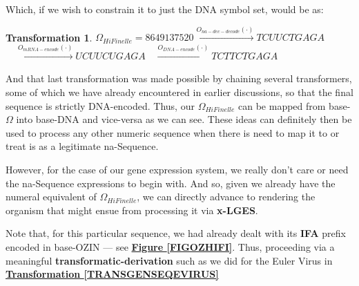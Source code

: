 \documentclass[a4paper, 18pt]{book} %
\newtheorem{trans}{Transformation}
\begin{document}
Which, if we wish to constrain it to just the DNA symbol set, would be as:

\vspace{1em}
\begin{trans}
$\Omega_{HiFinelle} = 8649137520 \xrightarrow{O_{na-dec-decode}(\cdot)} TCUUCTGAGA$\\
$ \quad  \xrightarrow{O_{mRNA-encode}(\cdot)} UCUUCUGAGA \quad  \xrightarrow{O_{DNA-encode}(\cdot)} TCTTCTGAGA$
\end{trans}
\vspace{1em}


And that last transformation was made possible by chaining several transformers, some of which we have already encountered in earlier discussions, so that the final sequence is strictly DNA-encoded. Thus, our $\Omega_{HiFinelle}$ can be mapped from base-$\Omega$ into base-DNA and vice-versa as we can see. These ideas can definitely then be used to process any other numeric sequence when there is need to map it to or treat is as a legitimate na-Sequence.

However, for the case of our gene expression system, we really don't care or need the na-Sequence expressions to begin with. And so, given we already have the numeral equivalent of $\Omega_{HiFinelle}$, we can directly advance to rendering the organism that might ensue from processing it via \textbf{x-LGES}. 

Note that, for this particular sequence, we had already dealt with its \textbf{IFA} prefix encoded in base-OZIN --- see \textbf{\hyperref[FIGOZHIFI]{Figure \ref{FIGOZHIFI}}}. Thus, proceeding via a meaningful \textbf{transformatic-derivation} such as we did for the Euler Virus in \textbf{\hyperref[TRANSGENSEQEVIRUS]{Transformation \ref{TRANSGENSEQEVIRUS}}}
\end{document}
